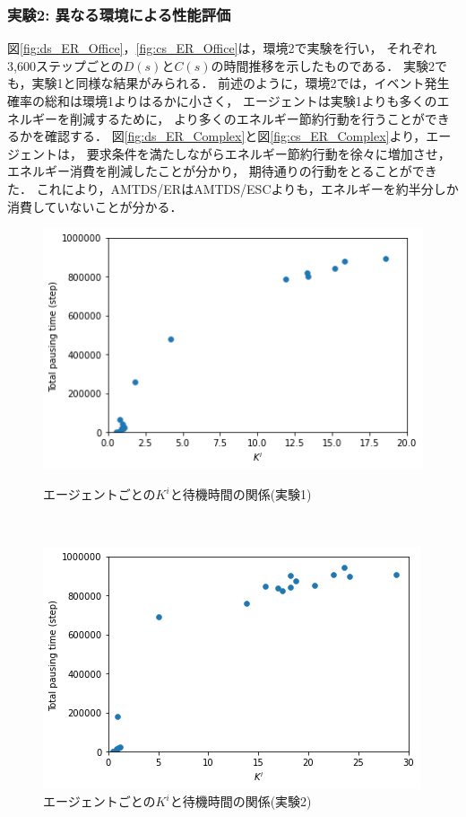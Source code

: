 \documentclass[12pt,a4j,twoside]{jarticle}
\begin{document}
  \subsubsection{実験2: 異なる環境による性能評価}\label{ex:ER2}
  図\ref{fig:ds_ER_Office}，\ref{fig:cs_ER_Office}は，環境2で実験を行い，
  それぞれ3,600ステップごとの$D(s)$と$C(s)$の時間推移を示したものである．
  実験2でも，実験1と同様な結果がみられる．
  前述のように，環境2では，イベント発生確率の総和は環境1よりはるかに小さく，
  エージェントは実験1よりも多くのエネルギーを削減するために，
  より多くのエネルギー節約行動を行うことができるかを確認する．
  図\ref{fig:ds_ER_Complex}と図\ref{fig:cs_ER_Complex}より，エージェントは，
  要求条件を満たしながらエネルギー節約行動を徐々に増加させ，エネルギー消費を削減したことが分かり，
  期待通りの行動をとることができた．
  これにより，AMTDS/ERはAMTDS/ESCよりも，エネルギーを約半分しか消費していないことが分かる．


  \begin{figure}
    \begin{minipage}{1.0\columnwidth}
      \centering
      \includegraphics[width=0.8\hsize]{figures/CorrectionScatter_Office_ER.png}
      \caption{エージェントごとの$K^i$と待機時間の関係(実験1)}
      \label{fig:cscatter_ER_Office}
    \end{minipage}
    \\[7pt]
    \begin{minipage}{1.0\columnwidth}
      \centering
      \includegraphics[width=0.8\hsize]{figures/CorrectionScatter_Complex_ER.png}
      \caption{エージェントごとの$K^i$と待機時間の関係(実験2)}
      \label{fig:cscatter_ER_Complex}
    \end{minipage}
  \end{figure}
\end{document}
